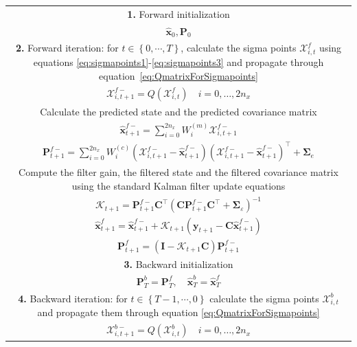 \documentclass[5p,authoryear]{elsarticle}
\begin{document}
\clearpage
\newpage
\renewcommand{\arraystretch}{1.7}
\begin{table}[!ht]
\begin{tabular}{|c|}\hline
\multicolumn{1}{|p{16cm}|}{\textbf{1.} Forward initialization} \\ 
$\hat{\mathbf x}_0, \mathbf P_0$ \\
\hline
\multicolumn{1}{|p{16cm}|}{\textbf{2.} Forward iteration: for $t \in \left\lbrace 0,\cdots, T\right\rbrace $, calculate the sigma points $\mathcal X_{i,t}^f$ using equations \ref{eq:sigmapoints1}-\ref{eq:sigmapoints3} and propagate through equation~\ref{eq:QmatrixForSigmapoints}} \\
$\mathcal X_{i,t+1}^{f-}=Q(\mathcal X_{i,t}^f) \quad i=0, \dots, 2n_x$\\
\multicolumn{1}{|p{16cm}|}{Calculate the predicted state and the predicted covariance matrix} \\
$\hat{\mathbf x}_{t+1}^{f-}=\sum_{i=0}^{2n_x} W_i^{(m)}\mathcal X_{i,t+1}^{f-} $ \\
$\mathbf P_{t +1}^{f-}=\sum_{i=0}^{2n_x} W_i^{(c)}(\mathcal X_{i,t+1}^{f-}-\hat{\mathbf x}_{t +1}^{f-})(\mathcal X_{i,t+1}^{f-}-\hat{\mathbf x}_{t +1}^{f-})^\top+\boldsymbol \Sigma_e$ \\ 
\multicolumn{1}{|p{16cm}|}{Compute the filter gain, the filtered state and the filtered covariance matrix using the standard Kalman filter update equations} \\
$\mathcal K_{t+1}=\mathbf P_{t +1}^{f-}\mathbf C ^\top(\mathbf C \mathbf P_{t +1}^{f-}\mathbf C ^\top+\boldsymbol \Sigma_{\varepsilon})^{-1}$ \\
$\hat{\mathbf x}_{t+1}^{f}=\hat{\mathbf x}_{t+1}^{f-}+\mathcal K_{t+1}(\mathbf y_{t+1}-\mathbf C\hat{\mathbf x}_{t +1}^{f-})$ \\
$\mathbf P_{t+1}^f=(\mathbf I - \mathcal K_{t+1}\mathbf C)\mathbf P_{t +1}^{f-}$\\ 
\hline
\multicolumn{1}{|p{16cm}|}{\textbf{3.} Backward initialization}\\
$\mathbf P_T^b= \mathbf P_T^f, \quad \hat{\mathbf x}^b_T= \hat{\mathbf x}^f_T$ \\
\hline
\multicolumn{1}{|p{16cm}|}{\textbf{4.} Backward iteration: for $t \in \left\lbrace T-1, \cdots, 0 \right\rbrace $ calculate the sigma points $\mathcal X_{i,t}^b$ and propagate them through equation \ref{eq:QmatrixForSigmapoints}}\\
$\mathcal X_{i,t+1}^{b-}=Q(\mathcal X_{i,t}^b) \quad i=0, \dots, 2n_x$\\

\end{tabular}
\end{table}
\end{document}
